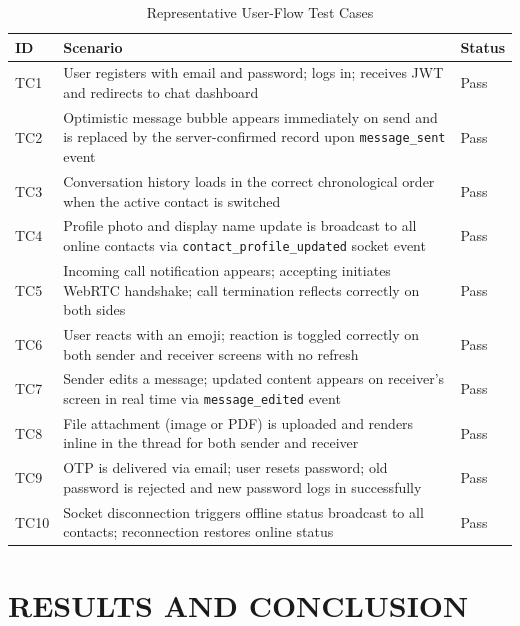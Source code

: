 \documentclass[12pt,a4paper,oneside]{report}
\begin{document}
\begin{table}[H]
\centering
\caption{Representative User-Flow Test Cases}
\begin{tabularx}{\textwidth}{|C{1.0cm}|X|C{2.0cm}|}
\hline
\textbf{ID} & \textbf{Scenario} & \textbf{Status} \\
\hline
TC1 & User registers with email and password; logs in; receives JWT and
      redirects to chat dashboard & Pass \\
\hline
TC2 & Optimistic message bubble appears immediately on send and is replaced
      by the server-confirmed record upon \texttt{message\_sent} event & Pass \\
\hline
TC3 & Conversation history loads in the correct chronological order when
      the active contact is switched & Pass \\
\hline
TC4 & Profile photo and display name update is broadcast to all online
      contacts via \texttt{contact\_profile\_updated} socket event & Pass \\
\hline
TC5 & Incoming call notification appears; accepting initiates WebRTC
      handshake; call termination reflects correctly on both sides & Pass \\
\hline
TC6 & User reacts with an emoji; reaction is toggled correctly on
      both sender and receiver screens with no refresh & Pass \\
\hline
TC7 & Sender edits a message; updated content appears on receiver's
      screen in real time via \texttt{message\_edited} event & Pass \\
\hline
TC8 & File attachment (image or PDF) is uploaded and renders inline
      in the thread for both sender and receiver & Pass \\
\hline
TC9 & OTP is delivered via email; user resets password; old password
      is rejected and new password logs in successfully & Pass \\
\hline
TC10 & Socket disconnection triggers offline status broadcast to all
       contacts; reconnection restores online status & Pass \\
\hline
\end{tabularx}
\end{table}

\cleardoublepage

\chapter{RESULTS AND CONCLUSION}
\label{chap:results}
\thispagestyle{plain}
\end{document}
